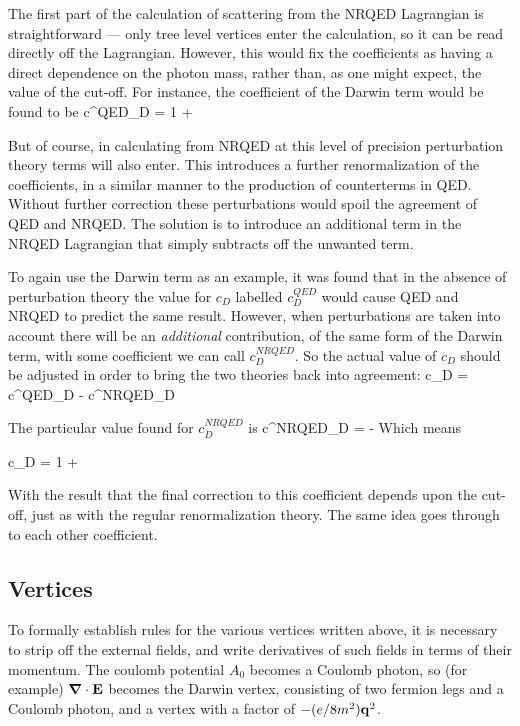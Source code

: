 The first part of the calculation of scattering from the NRQED Lagrangian is straightforward --- only tree level vertices enter the calculation, so it can be read directly off the Lagrangian.  However, this would fix the coefficients as having a direct dependence on the photon mass, rather than, as one might expect, the value of the cut-off.  For instance, the coefficient of the Darwin term would be found to be
\beq
	c^{QED}_D = 1 + \frac{\alpha}{\pi} 
\eeq

But of course, in calculating from NRQED at this level of precision perturbation theory terms will also enter. This introduces a further renormalization of the coefficients, in a similar manner to the production of counterterms in QED.  Without further correction these perturbations would spoil the agreement of QED and NRQED.  The solution is to introduce an additional term in the NRQED Lagrangian that simply subtracts off the unwanted term.

To again use the Darwin term as an example, it was found that in the absence of perturbation theory the value for $c_D$ labelled $c^{QED}_D$ would cause QED and NRQED to predict the same result.  However, when perturbations are taken into account there will be an {\it additional} contribution, of the same form of the Darwin term, with some coefficient we can call $c^{NRQED}_D$.  So the actual value of $c_D$ should be adjusted in order to bring the two theories back into agreement:
\beq
	c_D = c^{QED}_D - c^{NRQED}_D
\eeq

The particular value found for $c^{NRQED}_D$ is 
\beq
	c^{NRQED}_D = -\frac{\alpha}{\pi} 
\eeq
Which means

\beq
	c_D = 1 + \frac{\alpha}{\pi} 
\eeq

With the result that the final correction to this coefficient depends upon the cut-off, just as with the regular renormalization theory.  The same idea goes through to each other coefficient.


\subsection{Vertices}


To formally establish rules for the various vertices written above, it is necessary to strip off the external fields, and write derivatives of such fields in terms of their momentum.  The coulomb potential $A_0$ becomes a Coulomb photon, so (for example) $\mbox{\boldmath$ \nabla $} \cdot \mathbf{E}$ becomes the Darwin vertex, consisting of two fermion legs and a Coulomb photon, and a vertex with a factor of $-(e / 8m^2 ) \mathbf{q}^2$.

